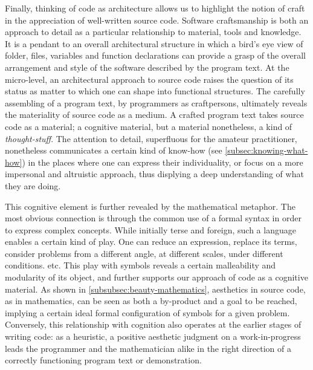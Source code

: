 Finally, thinking of code as architecture allows us to highlight the notion of craft in the appreciation of well-written source code. Software craftsmanship is both an approach to detail as a particular relationship to material, tools and knowledge. It is a pendant to an overall architectural structure in which a bird's eye view of folder, files, variables and function declarations can provide a grasp of the overall arrangement and style of the software described by the program text. At the micro-level, an architectural approach to source code raises the question of its status as matter to which one can shape into functional structures. The carefully assembling of a program text, by programmers as craftpersons, ultimately reveals the materiality of source code as a medium. A crafted program text takes source code as a material; a cognitive material, but a material nonetheless, a kind of \emph{thought-stuff}. The attention to detail, superfluous for the amateur practitioner, nonetheless communicates a certain kind of know-how (see \ref{subsec:knowing-what-how}) in the places where one can express their individuality, or focus on a more impersonal and altruistic approach, thus displying a deep understanding of what they are doing.

This cognitive element is further revealed by the mathematical metaphor. The most obvious connection is through the common use of a formal syntax in order to express complex concepts. While initially terse and foreign, such a language enables a certain kind of play. One can reduce an expression, replace its terms, consider problems from a different angle, at different scales, under different conditions. etc. This play with symbols reveals a certain malleability and modularity of its object, and further supports our approach of code as a cognitive material. As shown in \ref{subsubsec:beauty-mathematics}, aesthetics in source code, as in mathematics, can be seen as both a by-product and a goal to be reached, implying a certain ideal formal configuration of symbols for a given problem. Conversely, this relationship with cognition also operates at the earlier stages of writing code: as a heuristic, a positive aesthetic judgment on a work-in-progress leads the programmer and the mathematician alike in the right direction of a correctly functioning program text or demonstration.


